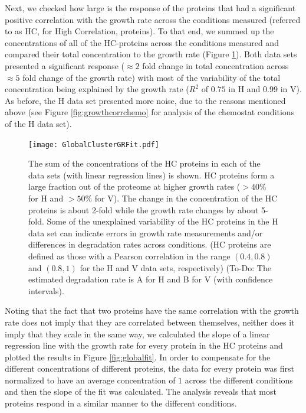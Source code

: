 \documentclass[notitlepage]{article}
\begin{document}
Next, we checked how large is the response of the proteins that had a significant positive correlation with the growth rate across the conditions measured (referred to as HC, for High Correlation, proteins).
To that end, we summed up the concentrations of all of the HC-proteins across the conditions measured and compared their total concentration to the growth rate (Figure \ref{fig:globalgrcorr}).
Both data sets presented a significant response ($\approx 2$ fold change in total concentration across $\approx 5$ fold change of the growth rate) with most of the variability of the total concentration being explained by the growth rate ($R^2$ of $0.75$ in H and $0.99$ in V). 
As before, the H data set presented more noise, due to the reasons mentioned above (see Figure \ref{fig:growthcorrchemo} for analysis of the chemostat conditions of the H data set).

\begin{figure}[h]
\centering
\texttt{[image: GlobalClusterGRFit.pdf]}
\caption{
The sum of the concentrations of the HC proteins in each of the data sets (with linear regression lines) is shown.
HC proteins form a large fraction out of the proteome at higher growth rates ($>40\%$ for H and $>50\%$ for V).
The change in the concentration of the HC proteins is about 2-fold while the growth rate changes by about 5-fold.
Some of the unexplained variability of the HC proteins in the H data set can indicate errors in growth rate measurements and/or differences in degradation rates across conditions.
(HC proteins are defined as those with a Pearson correlation in the range $(0.4,0.8)$ and $(0.8,1)$ for the H and V data sets, respectively)
(To-Do: The estimated degradation rate is A for H and B for V (with confidence intervals).
}
\label{fig:globalgrcorr}
\end{figure}

Noting that the fact that two proteins have the same correlation with the growth rate does not imply that they are correlated between themselves, neither does it imply that they scale in the same way, we calculated the slope of a linear regression line with the growth rate for every protein in the HC proteins and plotted the results in Figure \ref{fig:globalfit}.
In order to compensate for the different concentrations of different proteins, the data for every protein was first normalized to have an average concentration of $1$ across the different conditions and then the slope of the fit was calculated.
The analysis reveals that most proteins respond in a similar manner to the different conditions.
\end{document}
